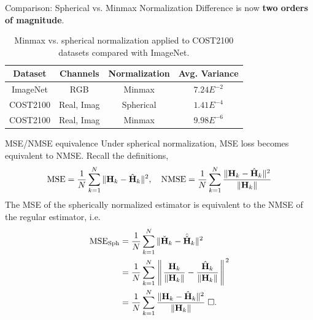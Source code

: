\documentclass{beamer}
\begin{document}
  \begin{frame}{Comparison: Spherical vs. Minmax Normalization}
    Difference is now \textbf{two orders of magnitude}.
    \begin{table}[htb]
      \begin{center}
        \begin{tabular}{|c|c|c|c|}
        \hline
        \textbf{Dataset} & \textbf{Channels} & \textbf{Normalization} & \textbf{Avg. Variance} \\ \hline
        ImageNet       & RGB                 & Minmax                 & \underline{$7.24E^{-2}$}       \\ \hline
        COST2100       & Real, Imag          & Spherical              & \underline{$1.41E^{-4}$}       \\ \hline
        COST2100       & Real, Imag          & Minmax                 & $9.98E^{-6}$       \\ \hline
        \end{tabular}
        \caption{Minmax vs. spherical normalization applied to COST2100 datasets compared with ImageNet.}
        \label{tab:minmax-sph-compare} 
      \end{center}
    \end{table}
  \end{frame}
{}
  \begin{frame}{MSE/NMSE equivalence}
    \footnotesize{
    Under spherical normalization, MSE loss becomes equivalent to NMSE. Recall the definitions,
    \begin{align*}
      \text{MSE}=\frac 1N \sum_{k=1}^N\Arrowvert\mathbf H_k - \hat{\mathbf H}_k\Arrowvert^2,\quad \text{NMSE} =\frac 1N \sum_{k=1}^N\frac{\Arrowvert\mathbf H_k - \hat{\mathbf H}_k\Arrowvert^2}{\Arrowvert\mathbf H_k\Arrowvert} \\        
    \end{align*}
    \pause
    The MSE of the spherically normalized estimator is equivalent to the NMSE of the regular estimator, i.e.
    \begin{align*}
      \text{MSE}_{\text{Sph}} &= \frac 1N \sum_{k=1}^N\Arrowvert\check{\mathbf H}_k - \hat{\check{\mathbf H}}_k\Arrowvert^2 \\
      &= \frac 1N \sum_{k=1}^N\left\Arrowvert \frac{\mathbf H_k}{\Arrowvert\mathbf H_k\Arrowvert} - \frac{\hat{\mathbf H}_k}{\Arrowvert\mathbf H_k\Arrowvert}\right\Arrowvert^2 \\
      &= \frac 1N \sum_{k=1}^N\frac{\Arrowvert\mathbf H_k - \hat{\mathbf H}_k\Arrowvert^2}{\Arrowvert\mathbf H_k\Arrowvert} \; \Box.
    \end{align*}
    }
\end{frame}
\end{document}
